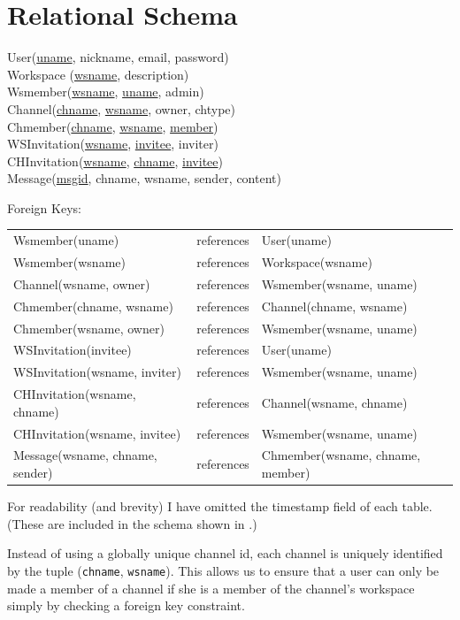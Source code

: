 \documentclass{article}
\newcommand{\ze}{she\xspace}
\begin{document}
\section{Relational Schema}
{
\ttfamily
\noindent
User(\underline{uname}, nickname, email, password) \\
Workspace (\underline{wsname}, description) \\
Wsmember(\underline{wsname}, \underline{uname}, admin) \\
Channel(\underline{chname}, \underline{wsname}, owner, chtype) \\
Chmember(\underline{chname}, \underline{wsname}, \underline{member}) \\
WSInvitation(\underline{wsname}, \underline{invitee}, inviter) \\
CHInvitation(\underline{wsname}, \underline{chname}, \underline{invitee}) \\
Message(\underline{msgid}, chname, wsname, sender, content)

\noindent
\textnormal{Foreign Keys:}

\begin{tabular}{lcl}
Wsmember(uname)                 & references & User(uname) \\
Wsmember(wsname)                & references & Workspace(wsname) \\
Channel(wsname, owner)          & references & Wsmember(wsname, uname) \\
Chmember(chname, wsname)        & references & Channel(chname, wsname) \\
Chmember(wsname, owner)         & references & Wsmember(wsname, uname) \\
WSInvitation(invitee)           & references & User(uname) \\
WSInvitation(wsname, inviter)   & references & Wsmember(wsname, uname) \\
CHInvitation(wsname, chname)    & references & Channel(wsname, chname) \\
CHInvitation(wsname, invitee)   & references & Wsmember(wsname, uname) \\
Message(wsname, chname, sender) & references & Chmember(wsname, chname, member) \\
\end{tabular}
}

For readability (and brevity) I have omitted the timestamp field of each table. (These are included in the schema shown in .)

Instead of using a globally unique channel id, each channel is uniquely identified by the tuple (\texttt{chname}, \texttt{wsname}). This allows us to ensure that a user can only be made a member of a channel if \ze is a member of the channel's workspace simply by checking a foreign key constraint.
\end{document}
